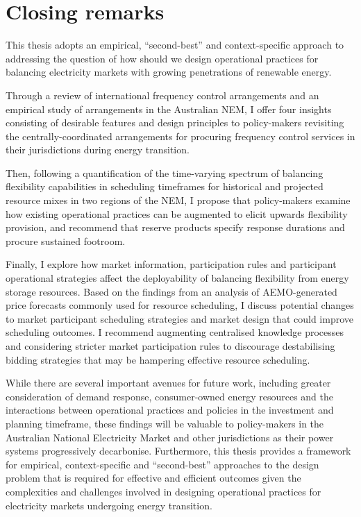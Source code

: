 \documentclass[12pt,a4paper,]{report}
\begin{document}
\hypertarget{sec:conclusion-closing_remarks}{%
\section{Closing remarks}\label{sec:conclusion-closing_remarks}}

This thesis adopts an empirical, ``second-best'' and context-specific
approach to addressing the question of how should we design operational
practices for balancing electricity markets with growing penetrations of
renewable energy.

Through a review of international frequency control arrangements and an
empirical study of arrangements in the Australian NEM, I offer four
insights consisting of desirable features and design principles to
policy-makers revisiting the centrally-coordinated arrangements for
procuring frequency control services in their jurisdictions during
energy transition.

Then, following a quantification of the time-varying spectrum of
balancing flexibility capabilities in scheduling timeframes for
historical and projected resource mixes in two regions of the NEM, I
propose that policy-makers examine how existing operational practices
can be augmented to elicit upwards flexibility provision, and recommend
that reserve products specify response durations and procure sustained
footroom.

Finally, I explore how market information, participation rules and
participant operational strategies affect the deployability of balancing
flexibility from energy storage resources. Based on the findings from an
analysis of AEMO-generated price forecasts commonly used for resource
scheduling, I discuss potential changes to market participant scheduling
strategies and market design that could improve scheduling outcomes. I
recommend augmenting centralised knowledge processes and considering
stricter market participation rules to discourage destabilising bidding
strategies that may be hampering effective resource scheduling.

While there are several important avenues for future work, including
greater consideration of demand response, consumer-owned energy
resources and the interactions between operational practices and
policies in the investment and planning timeframe, these findings will
be valuable to policy-makers in the Australian National Electricity
Market and other jurisdictions as their power systems progressively
decarbonise. Furthermore, this thesis provides a framework for
empirical, context-specific and ``second-best'' approaches to the design
problem that is required for effective and efficient outcomes given the
complexities and challenges involved in designing operational practices
for electricity markets undergoing energy transition.
\end{document}
